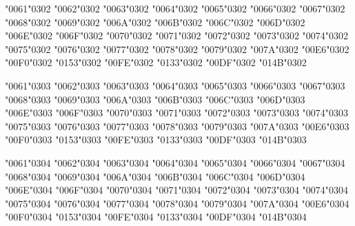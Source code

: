 {\textsc{\char"0061\char"0302} \textsc{\char"0062\char"0302} \textsc{\char"0063\char"0302} \textsc{\char"0064\char"0302} \textsc{\char"0065\char"0302} \textsc{\char"0066\char"0302} \textsc{\char"0067\char"0302} \textsc{\char"0068\char"0302} \textsc{\char"0069\char"0302} \textsc{\char"006A\char"0302} \textsc{\char"006B\char"0302} \textsc{\char"006C\char"0302} \textsc{\char"006D\char"0302} \textsc{\char"006E\char"0302} \textsc{\char"006F\char"0302} \textsc{\char"0070\char"0302} \textsc{\char"0071\char"0302} \textsc{\char"0072\char"0302} \textsc{\char"0073\char"0302} \textsc{\char"0074\char"0302} \textsc{\char"0075\char"0302} \textsc{\char"0076\char"0302} \textsc{\char"0077\char"0302} \textsc{\char"0078\char"0302} \textsc{\char"0079\char"0302} \textsc{\char"007A\char"0302} \textsc{\char"00E6\char"0302} \textsc{\char"00F0\char"0302} \textsc{\char"0153\char"0302} \textsc{\char"00FE\char"0302} \textsc{\char"0133\char"0302} \textsc{\char"00DF\char"0302} \textsc{\char"014B\char"0302}

\textsc{\char"0061\char"0303} \textsc{\char"0062\char"0303} \textsc{\char"0063\char"0303} \textsc{\char"0064\char"0303} \textsc{\char"0065\char"0303} \textsc{\char"0066\char"0303} \textsc{\char"0067\char"0303} \textsc{\char"0068\char"0303} \textsc{\char"0069\char"0303} \textsc{\char"006A\char"0303} \textsc{\char"006B\char"0303} \textsc{\char"006C\char"0303} \textsc{\char"006D\char"0303} \textsc{\char"006E\char"0303} \textsc{\char"006F\char"0303} \textsc{\char"0070\char"0303} \textsc{\char"0071\char"0303} \textsc{\char"0072\char"0303} \textsc{\char"0073\char"0303} \textsc{\char"0074\char"0303} \textsc{\char"0075\char"0303} \textsc{\char"0076\char"0303} \textsc{\char"0077\char"0303} \textsc{\char"0078\char"0303} \textsc{\char"0079\char"0303} \textsc{\char"007A\char"0303} \textsc{\char"00E6\char"0303} \textsc{\char"00F0\char"0303} \textsc{\char"0153\char"0303} \textsc{\char"00FE\char"0303} \textsc{\char"0133\char"0303} \textsc{\char"00DF\char"0303} \textsc{\char"014B\char"0303}

\textsc{\char"0061\char"0304} \textsc{\char"0062\char"0304} \textsc{\char"0063\char"0304} \textsc{\char"0064\char"0304} \textsc{\char"0065\char"0304} \textsc{\char"0066\char"0304} \textsc{\char"0067\char"0304} \textsc{\char"0068\char"0304} \textsc{\char"0069\char"0304} \textsc{\char"006A\char"0304} \textsc{\char"006B\char"0304} \textsc{\char"006C\char"0304} \textsc{\char"006D\char"0304} \textsc{\char"006E\char"0304} \textsc{\char"006F\char"0304} \textsc{\char"0070\char"0304} \textsc{\char"0071\char"0304} \textsc{\char"0072\char"0304} \textsc{\char"0073\char"0304} \textsc{\char"0074\char"0304} \textsc{\char"0075\char"0304} \textsc{\char"0076\char"0304} \textsc{\char"0077\char"0304} \textsc{\char"0078\char"0304} \textsc{\char"0079\char"0304} \textsc{\char"007A\char"0304} \textsc{\char"00E6\char"0304} \textsc{\char"00F0\char"0304} \textsc{\char"0153\char"0304} \textsc{\char"00FE\char"0304} \textsc{\char"0133\char"0304} \textsc{\char"00DF\char"0304} \textsc{\char"014B\char"0304}

}
